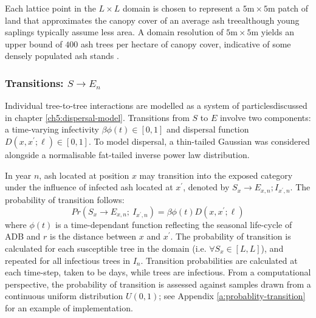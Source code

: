 Each lattice point in the $L\times L$ domain is chosen to represent a $5\mathrm{m}\times5\mathrm{m}$ patch of land that approximates the canopy cover of an average ash tree\textemdash although young saplings typically assume less area. 
A domain resolution of $5\mathrm{m}\times5\mathrm{m}$ yields an upper bound of $400$ ash trees per hectare of canopy cover, indicative of some densely populated ash stands \cite{ash-tree2, ash-tree1}. %

\subsubsection{Transitions: $S\rightarrow E_n$}

Individual tree-to-tree interactions are modelled as a system of particles\textemdash discussed in chapter \ref{ch5:dispersal-model}.
Transitions from $S$ to $E$ involve two components: a time-varying infectivity $\beta\phi(t)\in [0, 1]$ and dispersal function $D(x,x^\prime; \ell)\in [0, 1]$.
To model dispersal, a thin-tailed Gaussian was considered alongside a normalisable fat-tailed inverse power law distribution.

In year $n$, ash located at position $x$ may transition into the exposed category under the influence of infected ash located at $x^\prime$, denoted by $S_x \rightarrow E_{x,n}; I_{x^\prime, n}$.
The probability of transition follows:
\begin{equation}
    Pr(S_{x} \rightarrow E_{x,n} ;\ I_{x^{\prime}, n} ) = \beta  \phi(t) D(x, x^{\prime}; \ell)
\end{equation}
where $\phi(t)$ is a time-dependant function reflecting the seasonal life-cycle of ADB and $r$ is the distance between $x$ and $x^\prime$.
The probability of transition is calculated for each susceptible tree in the domain (i.e. $\forall S_x \in [L, L]$),
and repeated for all infectious trees in $I_n$.
Transition probabilities are calculated at each time-step, taken to be days, while trees are infectious.
From a computational perspective, the probability of transition is assessed against samples drawn from a continuous uniform distribution $U(0, 1)$;
see Appendix \ref{a:probablity-transition} for an example of implementation.


